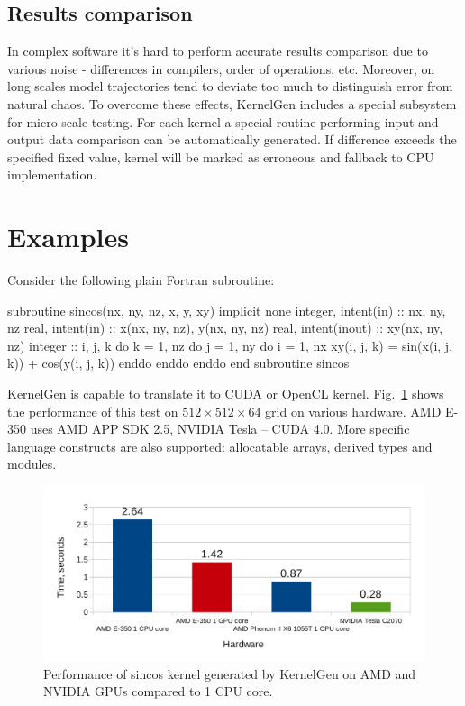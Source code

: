 \documentclass[a4,12pt]{article}
\begin{document}
\subsection{Results comparison}

In complex software it's hard to perform accurate results comparison due to various noise - differences in compilers, order of operations, etc. Moreover, on long scales model trajectories tend to deviate too much to distinguish error from natural chaos. To overcome these effects, KernelGen includes a special subsystem for micro-scale testing. For each kernel a special routine performing input and output data comparison can be automatically generated. If difference exceeds the specified fixed value, kernel will be marked as erroneous and fallback to CPU implementation.

\section{Examples}

Consider the following plain Fortran subroutine:

\begin{code}
subroutine sincos(nx, ny, nz, x, y, xy)
implicit none
integer, intent(in) :: nx, ny, nz
real, intent(in) :: x(nx, ny, nz), y(nx, ny, nz)
real, intent(inout) :: xy(nx, ny, nz)
integer :: i, j, k
do k = 1, nz
  do j = 1, ny
    do i = 1, nx
      xy(i, j, k) = sin(x(i, j, k)) + cos(y(i, j, k))
    enddo
  enddo
enddo
end subroutine sincos
\end{code}

KernelGen is capable to translate it to CUDA or OpenCL kernel. Fig.~\ref{fig:sincos_perf} shows the performance of this test on $512\times 512\times 64$ grid on various hardware. AMD E-350 uses AMD APP SDK 2.5, NVIDIA Tesla -- CUDA 4.0. More specific language constructs are also supported: allocatable arrays, derived types and modules.

\begin{figure}
\centering
\includegraphics[scale=0.8]{figures/sincos.pdf}
\caption{Performance of sincos kernel generated by KernelGen on AMD and NVIDIA GPUs compared to 1 CPU core.}
\label{fig:sincos_perf}
\end{figure}
\end{document}
